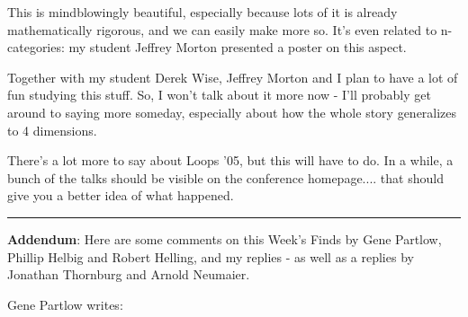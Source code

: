 This is mindblowingly beautiful, especially because lots of it is 
already mathematically rigorous, and we can easily make more so.  
It's even related to n-categories: my student Jeffrey Morton
presented a poster on this aspect.  

Together with my student Derek Wise, Jeffrey Morton and I plan to have 
a lot of fun studying this stuff.  So, I won't talk about it more now - 
I'll probably get around to saying more someday, especially about how 
the whole story generalizes to 4 dimensions.

There's a lot more to say about Loops '05, but this will have to do.
In a while, a bunch of the talks should be visible on the conference 
homepage.... that should give you a better idea of what happened.
 
\par\noindent\rule{\textwidth}{0.4pt}

\textbf{Addendum}: Here are some comments on this Week's Finds by Gene Partlow,
Phillip Helbig and Robert Helling, and my replies - as well as a replies
by Jonathan Thornburg and Arnold Neumaier.

Gene Partlow writes: 



